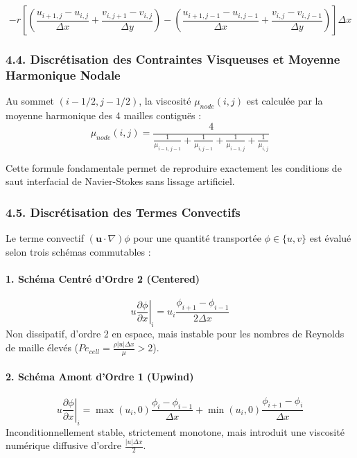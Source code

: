 \documentclass[
  french,
]{article}
\begin{document}
\[- r \left[ \left( \frac{u_{i+1, j} - u_{i, j}}{\Delta x} + \frac{v_{i, j+1} - v_{i, j}}{\Delta y} \right) - \left( \frac{u_{i+1, j-1} - u_{i, j-1}}{\Delta x} + \frac{v_{i, j} - v_{i, j-1}}{\Delta y} \right) \right] \Delta x\]

\subsubsection{4.4. Discrétisation des Contraintes Visqueuses et Moyenne
Harmonique
Nodale}\label{discruxe9tisation-des-contraintes-visqueuses-et-moyenne-harmonique-nodale}

Au sommet \((i-1/2, j-1/2)\), la viscosité \(\mu_{node}(i, j)\) est
calculée par la moyenne harmonique des 4 mailles contiguës :
\[\mu_{node}(i, j) = \frac{4}{\frac{1}{\mu_{i-1, j-1}} + \frac{1}{\mu_{i, j-1}} + \frac{1}{\mu_{i-1, j}} + \frac{1}{\mu_{i, j}}}\]

Cette formule fondamentale permet de reproduire exactement les
conditions de saut interfacial de Navier-Stokes sans lissage artificiel.

\subsubsection{4.5. Discrétisation des Termes
Convectifs}\label{discruxe9tisation-des-termes-convectifs}

Le terme convectif \((\mathbf{u} \cdot \nabla) \phi\) pour une quantité
transportée \(\phi \in \{u, v\}\) est évalué selon trois schémas
commutables :

\paragraph{1. Schéma Centré d'Ordre 2
(Centered)}\label{schuxe9ma-centruxe9-dordre-2-centered}

\[u \left.\frac{\partial \phi}{\partial x}\right|_i = u_i \frac{\phi_{i+1} - \phi_{i-1}}{2\Delta x}\]
Non dissipatif, d'ordre 2 en espace, mais instable pour les nombres de
Reynolds de maille élevés
(\(Pe_{cell} = \frac{\rho |u| \Delta x}{\mu} > 2\)).

\paragraph{2. Schéma Amont d'Ordre 1
(Upwind)}\label{schuxe9ma-amont-dordre-1-upwind}

\[u \left.\frac{\partial \phi}{\partial x}\right|_i = \max(u_i, 0) \frac{\phi_i - \phi_{i-1}}{\Delta x} + \min(u_i, 0) \frac{\phi_{i+1} - \phi_i}{\Delta x}\]
Inconditionnellement stable, strictement monotone, mais introduit une
viscosité numérique diffusive d'ordre \(\frac{|u| \Delta x}{2}\).
\end{document}
